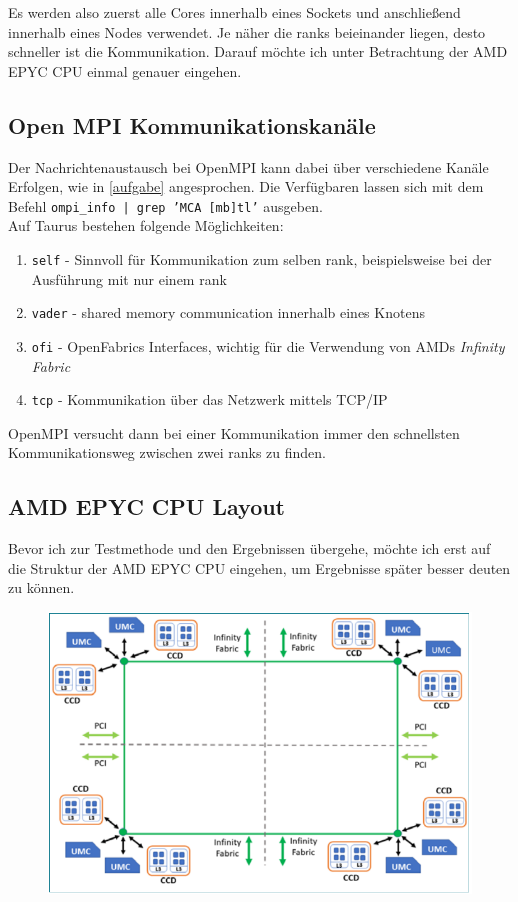 \documentclass[german,plainarticle,hyperref,utf8]{zihpub}
\begin{document}
	Es werden also zuerst alle Cores innerhalb eines Sockets und anschließend innerhalb eines Nodes verwendet. Je näher die ranks beieinander liegen, desto schneller ist die Kommunikation. Darauf möchte ich unter Betrachtung der AMD EPYC CPU einmal genauer eingehen.
	\subsection{Open MPI Kommunikationskanäle}
	Der Nachrichtenaustausch bei OpenMPI kann dabei über verschiedene Kanäle Erfolgen, wie in \ref{aufgabe} angesprochen. Die Verfügbaren lassen sich mit dem Befehl \texttt{ompi\_info | grep 'MCA [mb]tl'} ausgeben.\\
	Auf Taurus bestehen folgende Möglichkeiten:
	\begin{enumerate}
		\item \texttt{self} - Sinnvoll für Kommunikation zum selben rank, beispielsweise bei der Ausführung mit nur einem rank
		\item \texttt{vader} - shared memory communication innerhalb eines Knotens 
		\item \texttt{ofi} - OpenFabrics Interfaces, wichtig für die Verwendung von AMDs \textit{Infinity Fabric}
		\item \texttt{tcp} - Kommunikation über das Netzwerk mittels TCP/IP
	\end{enumerate}
	OpenMPI versucht dann bei einer Kommunikation immer den schnellsten Kommunikationsweg zwischen zwei ranks zu finden.
	\clearpage
	\subsection{AMD EPYC CPU Layout} \label{cpu_layout}
	Bevor ich zur Testmethode und den Ergebnissen übergehe, möchte ich erst auf die Struktur der AMD EPYC CPU eingehen, um Ergebnisse später besser deuten zu können.\\
	
	\begin{figure}[h]
		\centering
		\includegraphics[scale=0.5]{AMD_EPYC.png}
	\end{figure}
	
\end{document}
